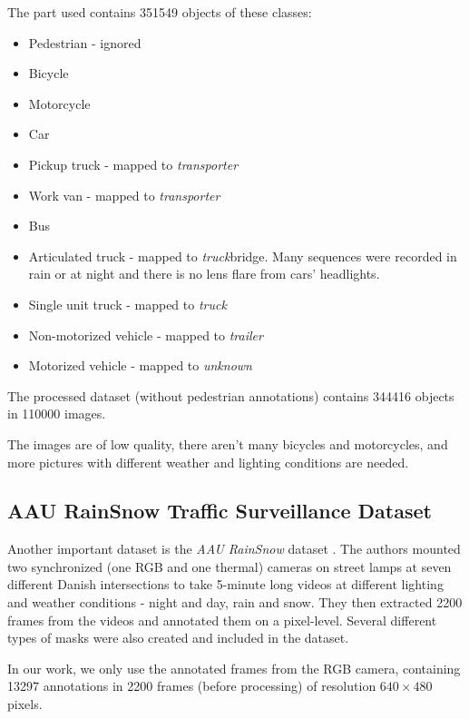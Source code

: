 The part used contains \num{351549} objects of these classes:
\begin{itemize}
    \item Pedestrian - ignored
    \item Bicycle
    \item Motorcycle
    \item Car
    \item Pickup truck - mapped to \textit{transporter}
    \item Work van - mapped to \textit{transporter}
    \item Bus
    \item Articulated truck - mapped to \textit{truck}bridge. Many sequences were recorded in rain or at night and there is no lens flare from
    cars' headlights.
    \item Single unit truck - mapped to \textit{truck}
    \item Non-motorized vehicle - mapped to \textit{trailer}
    \item Motorized vehicle - mapped to \textit{unknown}
\end{itemize}
The processed dataset (without pedestrian annotations) contains \num{344416}
objects in \num{110000} images.

The images are of low quality, there aren't many bicycles and motorcycles, and
more pictures with different weather and lighting conditions are needed.



\subsection*{AAU RainSnow Traffic Surveillance Dataset}
\label{AAUDataset}

Another important dataset is the \textit{AAU RainSnow} dataset
\cite{Bahnsen2019}. The authors mounted two synchronized (one RGB and one
thermal) cameras on street lamps at seven different Danish intersections to take
5-minute long videos at different lighting and weather conditions - night and
day, rain and snow. They then extracted \num{2200} frames from the videos and
annotated them on a pixel-level. Several different types of masks were also
created and included in the dataset.

In our work, we only use the annotated frames from the RGB camera, containing
\num{13297} annotations in \num{2200} frames (before processing) of resolution
$640 \times 480$ pixels. 

